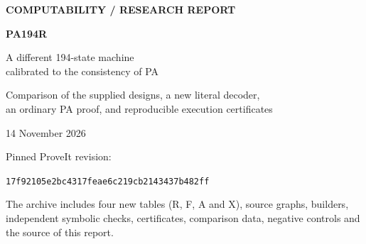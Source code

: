 \documentclass[11pt,letterpaper]{article}
\newcommand{\PA}{\mathrm{PA}}
\newcommand{\Con}{\operatorname{Con}}
\newcommand{\Halt}{\operatorname{Halt}}
\newcommand{\snapshot}{\texttt{17f92105e2bc4317feae6c219cb2143437b482ff}}
\begin{document}
\begin{titlepage}
\color{ink}
{\Large\bfseries COMPUTABILITY / RESEARCH REPORT\par}
\vspace{1.1cm}
{\Huge\bfseries PA194R\par}
\vspace{0.4cm}
{\LARGE A different 194-state machine\\[4pt] calibrated to the consistency of PA\par}
\vspace{0.8cm}
{\large Comparison of the supplied designs, a new literal decoder,\\
an ordinary PA proof, and reproducible execution certificates\par}
\vspace{0.8cm}
\color{black}
\begin{abstract}
No verified machine with fewer than 194 working states was found.
The main fallback, PA194R, combines a new decoder association with a
known-zero closing decrement in the symmetric cached controller.
Its 1,111 changed source-address paths implement exactly the resolved
source program of the simpler new table PA194F. A four-site invariant
proves that program equivalent, step for step, to the supplied PA194CS
source. Complete literal checks cover all 4,746 primitive outcomes,
including the unreachable positive decrement branch; blank startup
reaches the clean source seed after 57,768 transitions.

The zero-closing principle already occurs in the supplied 196-state
research. The new contribution is the verified 194-state composition,
its different decoder graph, the small preservation proof and the
bindings to the exact binary tables. The ordinary conclusion is
\[
 \PA\vdash\neg\Halt(\mathrm{PA194R})\leftrightarrow\Con(\PA).
\]
The inherited proof-producing logical calibration is stated and
attributed explicitly. This is not an end-to-end Lean or Rocq proof.
\end{abstract}
\vfill
{\large 14 November 2026\par}
\vspace{0.25cm}
Pinned ProveIt revision:\par
{\small\snapshot\par}
\vspace{0.3cm}
The archive includes four new tables (R, F, A and X), source graphs,
builders, independent symbolic checks, certificates, comparison data,
negative controls and the source of this report.
\end{titlepage}
\tableofcontents
\clearpage
\end{document}
